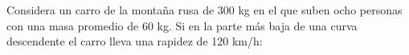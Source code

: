\question Considera un carro de la montaña rusa de 300 kg en el que suben ocho
personas con una masa promedio de 60 kg. Si en la parte más baja de
una curva descendente el carro lleva una rapidez de 120 km/h:

\begin{parts}
    
    
    
\end{parts}
